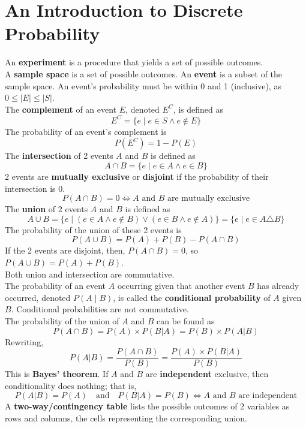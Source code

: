 \documentclass[./Discrete Math.tex]{subfiles}
\begin{document}
	\section{An Introduction to Discrete Probability}
		An \textbf{experiment} is a procedure that yields a set of possible outcomes. \\
		A \textbf{sample space} is a set of possible outcomes. An \textbf{event} is a subset of the sample space.
		An event's probability must be within 0 and 1 (inclusive), as \(0 \le |E| \le |S|\). \\
		The \textbf{complement} of an event \(E\), denoted \(E^C\), is defined as
			\[E^C = \{e \mid e \in S \land e \notin E\}\]
		The probability of an event's complement is
			\[P\left(E^C\right) = 1 - P(E)\]
		The \textbf{intersection} of 2 events \(A\) and \(B\) is defined as
			\[A \cap B = \{e \mid e \in A \land e \in B\}\]
			2 events are \textbf{mutually exclusive} or \textbf{disjoint} if the probability of their intersection is 0.
			\[P(A \cap B) = 0 \iff A \text{ and } B \text{ are mutually exclusive}\]
		The \textbf{union} of 2 events \(A\) and \(B\) is defined as
			\[
				A \cup B = \{e \mid (e \in A \land e \notin B) \lor (e \in B \land e \notin A)\}
					= \{e \mid e \in A \triangle B\}
			\]
			The probability of the union of these 2 events is
			\[P(A \cup B) = P(A) + P(B) - P(A \cap B)\]
			If the 2 events are disjoint, then, \(P(A \cap B) = 0\), so \(P(A \cup B) = P(A) + P(B)\). \\
		Both union and intersection are commutative. \\
		The probability of an event \(A\) occurring given that another event \(B\) has already occurred, denoted \(P(A \mid B)\), is called the \textbf{conditional probability} of \(A\) given \(B\). Conditional probabilities are not commutative. \\
		The probability of the union of \(A\) and \(B\) can be found as
			\[P(A \cap B) = P(A) \times P(B|A) = P(B) \times P(A|B)\]
			Rewriting,
			\[
				P(A|B) = \frac{P(A \cap B)}{P(B)}
					= \frac{P(A) \times P(B|A)}{P(B)}
			\]
			This is \textbf{Bayes' theorem}.
			If \(A\) and \(B\) are \textbf{independent} exclusive, then conditionality does nothing; that is,
			\[
				P(A|B) = P(A) \quad \text{and} \quad
				P(B|A) = P(B) \iff 
				A \text{ and } B \text{ are independent}
			\]
		A \textbf{two-way/contingency table} lists the possible outcomes of 2 variables as rows and columns, the cells representing the corresponding union.
\end{document}

